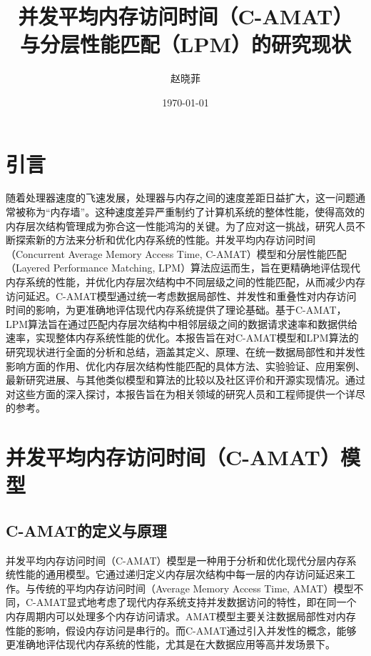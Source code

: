 \documentclass[UTF8]{ctexart}
\title{并发平均内存访问时间（C-AMAT）\\ 与分层性能匹配（LPM）的研究现状}
\author{赵晓菲}
\date{\today}
\begin{document}
\maketitle
\tableofcontents

\section{引言}
随着处理器速度的飞速发展，处理器与内存之间的速度差距日益扩大，这一问题通常被称为“内存墙”\cite{ref1}。这种速度差异严重制约了计算机系统的整体性能，使得高效的内存层次结构管理成为弥合这一性能鸿沟的关键。为了应对这一挑战，研究人员不断探索新的方法来分析和优化内存系统的性能。并发平均内存访问时间（Concurrent Average Memory Access Time, C-AMAT）模型和分层性能匹配（Layered Performance Matching, LPM）算法应运而生，旨在更精确地评估现代内存系统的性能，并优化内存层次结构中不同层级之间的性能匹配，从而减少内存访问延迟。C-AMAT模型通过统一考虑数据局部性、并发性和重叠性对内存访问时间的影响，为更准确地评估现代内存系统提供了理论基础。基于C-AMAT，LPM算法旨在通过匹配内存层次结构中相邻层级之间的数据请求速率和数据供给速率，实现整体内存系统性能的优化。本报告旨在对C-AMAT模型和LPM算法的研究现状进行全面的分析和总结，涵盖其定义、原理、在统一数据局部性和并发性影响方面的作用、优化内存层次结构性能匹配的具体方法、实验验证、应用案例、最新研究进展、与其他类似模型和算法的比较以及社区评价和开源实现情况。通过对这些方面的深入探讨，本报告旨在为相关领域的研究人员和工程师提供一个详尽的参考。

\section{并发平均内存访问时间（C-AMAT）模型}

\subsection{C-AMAT的定义与原理}
并发平均内存访问时间（C-AMAT）模型是一种用于分析和优化现代分层内存系统性能的通用模型\cite{sun2022proceedings}。它通过递归定义内存层次结构中每一层的内存访问延迟来工作\cite{sun2022proceedings}。与传统的平均内存访问时间（Average Memory Access Time, AMAT）模型不同，C-AMAT显式地考虑了现代内存系统支持并发数据访问的特性，即在同一个内存周期内可以处理多个内存访问请求\cite{sunCAMATPage}。AMAT模型主要关注数据局部性对内存性能的影响，假设内存访问是串行的\cite{wikiAMAT}。而C-AMAT通过引入并发性的概念，能够更准确地评估现代内存系统的性能，尤其是在大数据应用等高并发场景下\cite{sunCAMATPage}。
\end{document}
